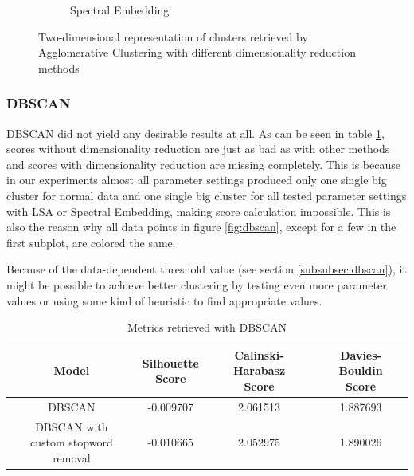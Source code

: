 \begin{figure}
\begin{subfigure}{.3\textwidth}
    \caption{Spectral Embedding}
    \label{fig:agglomerative_spectral}
  \end{subfigure}
  \caption{Two-dimensional representation of clusters retrieved by Agglomerative Clustering with different dimensionality reduction methods}
  \label{fig:agglomerative}
\end{figure}

\subsubsection{DBSCAN}

DBSCAN did not yield any desirable results at all. As can be seen in table \ref{tab:scores_dbscan}, scores without dimensionality reduction are just as bad as with other methods and scores with dimensionality reduction are missing completely. This is because in our experiments almost all parameter settings produced only one single big cluster for normal data and one single big cluster for all tested parameter settings with LSA or Spectral Embedding, making score calculation impossible.
This is also the reason why all data points in figure \ref{fig:dbscan}, except for a few in the first subplot, are colored the same.

Because of the data-dependent threshold value (see section \ref{subsubsec:dbscan}), it might be possible to achieve better clustering by testing even more parameter values or using some kind of heuristic to find appropriate values.

\begin{table}[]
  \centering
  \begin{tabular}{c|c|c|c}
    Model &  \shortstack[c]{Silhouette \\ Score} & \shortstack[c]{Calinski-Harabasz \\ Score} &  \shortstack[c]{Davies-Bouldin \\ Score}  \\
    \hline
    \hline
    DBSCAN & -0.009707 & 2.061513 & 1.887693 \\
    \hline
    \shortstack[c]{DBSCAN with \\ custom stopword removal} & -0.010665 & 2.052975 & 1.890026 \\
   \end{tabular}
  \caption{Metrics retrieved with DBSCAN}
  \label{tab:scores_dbscan}
\end{table}


